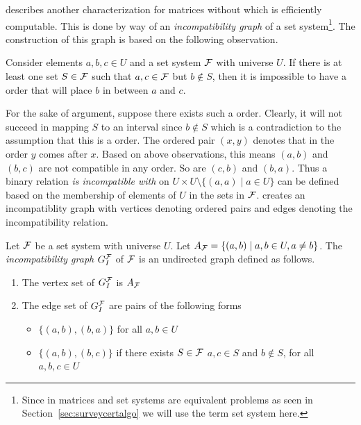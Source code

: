 \cite{mcc04} describes another characterization for matrices without
\COP which is efficiently computable. This is done by way of an {\em
  incompatibility graph} of a set system\footnote{Since \COP in
  matrices and set systems are equivalent problems as seen in
  Section~\ref{sec:surveycertalgo} we will use the term set system
  here.}. The construction of this graph is based on the following
observation. 

\begin{observation} 
  Consider elements $a, b, c \in U$ and a set system ${\cal F}$ with
  universe $U$. If there is at least one set $S \in {\cal F}$ such that $a,
  c \in {\cal F}$ but $b \notin S$, then it is impossible to have a \COP
  order that will place $b$ in between $a$ and $c$. 
\end{observation}

For the sake of argument, suppose there exists such a \COP
order. Clearly, it will not succeed in mapping $S$ to an interval
since $b \notin S$ which is a contradiction to the assumption that
this is a \COP order.  The ordered pair $(x,y)$ denotes that in the
\COP order $y$ comes after $x$. Based on above observations, this
means $(a,b)$ and $(b,c)$ are not compatible in any \COP order. So are
$(c,b)$ and $(b,a)$.  Thus a binary relation {\em is incompatible
  with} on $U \times U \setminus \{(a,a) \mid a \in U\}$ can be
defined based on the membership of elements of $U$ in the sets in
${\cal F}$.  \cite{mcc04} creates an incompatiblity graph with vertices
denoting ordered pairs and edges denoting the incompatibility
relation.

\begin{definition}
  Let ${\cal F}$ be a set system with universe $U$. Let $A_{{\cal F}} = \{(a,b)
  \mid a, b \in U, a \ne b\}$. The {\em incompatibility graph}
  $G_I^{\cal F}$ of ${\cal F}$ is an undirected graph defined as follows.
  \begin{enumerate}
  \item   The vertex set of $G_I^{\cal F}$ is $ A_{{\cal F}}$
  \item  The edge set of $G_I^{\cal F}$ are pairs of the following forms
    \begin{itemize}
    \item $\{(a,b),(b,a)\}$ for all $a, b \in U$
    \item $\{(a,b),(b,c)\}$ if there exists $S \in {\cal F}$ \stt $a, c
      \in S$ and $b \notin S$, for all $a, b, c \in U$
    \end{itemize}
  \end{enumerate}
  \dstop
\end{definition}

